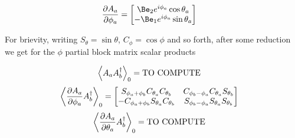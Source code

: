 \begin{align}\label{eqn:multiPendulumSpherical2:boo11}
\PD{\phi_a}{A_a}
&=
\begin{bmatrix}
\Be_2 e^{i \phi_a} \cos\theta_a \\
-\Be_1 e^{i \phi_a} \sin\theta_a
\end{bmatrix}
\end{align}

For brievity, writing $S_\theta = \sin\theta$, $C_\phi = \cos\phi$ and so forth, after some reduction we get for the $\phi$ partial block matrix scalar products

\begin{align}\label{eqn:multiPendulumSpherical2:boo12}
\gpgradezero{ A_a A_b^\dagger}
&=
\text{TO COMPUTE}
\end{align}
\begin{align}\label{eqn:multiPendulumSpherical2:boo13}
\gpgradezero{ \PD{\phi_a}{A_a} A_b^\dagger}
&=
\begin{bmatrix}
S_{\phi_a + \phi_b} C_{\theta_a} C_{\theta_b} & C_{\phi_b - \phi_a} C_{\theta_a} S_{\theta_b} \\
-C_{\phi_a + \phi_b} S_{\theta_a} C_{\theta_b} & S_{\phi_b - \phi_a} S_{\theta_a} S_{\theta_b} \\
\end{bmatrix}
\end{align}
\begin{align}\label{eqn:multiPendulumSpherical2:boo14}
\gpgradezero{ \PD{\theta_a}{A_a} A_b^\dagger}
&=
\text{TO COMPUTE}
\end{align}

\EndNoBibArticle
